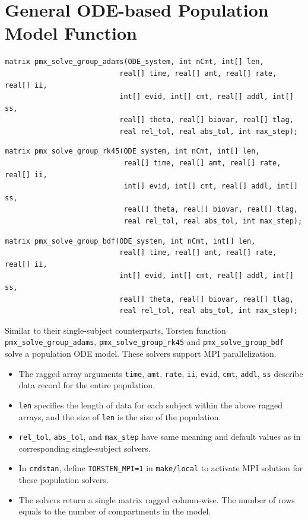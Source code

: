 \documentclass[11pt, reqno, oneside]{amsbook}
\numberwithin{equation}{chapter}
\numberwithin{figure}{chapter}
\numberwithin{table}{chapter}
\theoremstyle{remark}
\begin{document}
\section{General ODE-based Population Model Function}
\label{sec:orga5d445a}
\begin{verbatim}
matrix pmx_solve_group_adams(ODE_system, int nCmt, int[] len,
                           real[] time, real[] amt, real[] rate, real[] ii,
                           int[] evid, int[] cmt, real[] addl, int[] ss,
                           real[] theta, real[] biovar, real[] tlag,                      
                           real rel_tol, real abs_tol, int max_step);
\end{verbatim}
\begin{verbatim}
matrix pmx_solve_group_rk45(ODE_system, int nCmt, int[] len,
                            real[] time, real[] amt, real[] rate, real[] ii,
                            int[] evid, int[] cmt, real[] addl, int[] ss,
                            real[] theta, real[] biovar, real[] tlag,                      
                            real rel_tol, real abs_tol, int max_step);
\end{verbatim}
\begin{verbatim}
matrix pmx_solve_group_bdf(ODE_system, int nCmt, int[] len,
                           real[] time, real[] amt, real[] rate, real[] ii,
                           int[] evid, int[] cmt, real[] addl, int[] ss,
                           real[] theta, real[] biovar, real[] tlag,                      
                           real rel_tol, real abs_tol, int max_step);
\end{verbatim}
Similar to their single-subject counterparts, Torsten function \texttt{pmx\_solve\_group\_adams}, \texttt{pmx\_solve\_group\_rk45} and
\texttt{pmx\_solve\_group\_bdf} solve a population ODE model. These
solvers support MPI parallelization.
\begin{itemize}
\item The ragged array arguments \texttt{time}, \texttt{amt}, \texttt{rate}, \texttt{ii},
\texttt{evid}, \texttt{cmt}, \texttt{addl}, \texttt{ss} describe data record for the
entire population.
\item \texttt{len} specifies the length of data for each subject within
the above ragged arrays, and the size of \texttt{len} is the size
of the population.
\item \texttt{rel\_tol}, \texttt{abs\_tol},
and \texttt{max\_step} have same meaning and default values as in
corresponding single-subject solvers.
\item In \texttt{cmdstan}, define \texttt{TORSTEN\_MPI=1} in \texttt{make/local} to
activate MPI solution for these population solvers.
\item The solvers return a single matrix ragged column-wise. The
number of rows equals to the number of compartments in the model.
\end{itemize}
\end{document}
